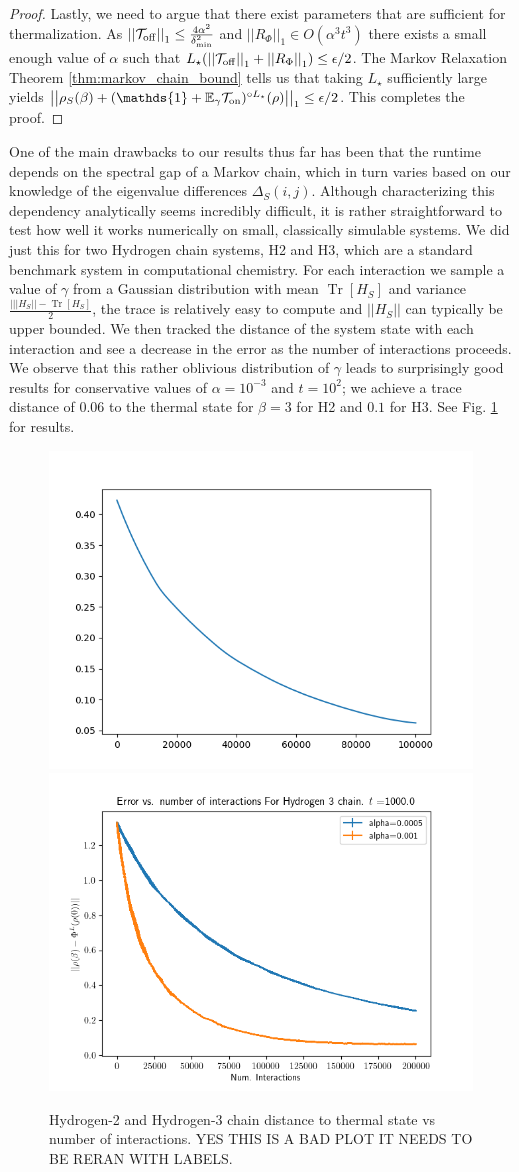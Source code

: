 \documentclass{article}
\newcommand{\on}{\rm on}
\newcommand{\off}{\rm off}
\newcommand{\brackets}[1]{\left[ #1 \right]}
\newcommand{\norm}[1]{\left| \left| #1 \right| \right|}
\newcommand{\bigo}[1]{O\left(#1\right)}
\DeclareMathOperator{\Tr}{Tr}
\newcommand{\trace}[1]{\Tr \brackets{ #1 }}
\newcommand{\identity}{\mathds{1}}
\begin{document}
\begin{proof}
Lastly, we need to argue that there exist parameters that are sufficient for thermalization. As $\norm{\mathcal{T}_{\off}}_1 \le \frac{4 \alpha^2}{\delta_{\min}^2}$ and $\norm{R_{\Phi}}_1 \in \bigo{\alpha^3 t^3}$ there exists a small enough value of $\alpha$ such that $L_{\star}(\norm{\mathcal{T}_{\off}}_1 + \norm{R_{\Phi}}_1) \le \epsilon / 2$. The Markov Relaxation Theorem \ref{thm:markov_chain_bound} tells us that taking $L_{\star}$ sufficiently large yields $\norm{\rho_S(\beta) + (\identity + \mathbb{E}_{\gamma} \mathcal{T}_{\on})^{\circ L_{\star}}(\rho)}_1 \le \epsilon /2$. This completes the proof.
\end{proof}

One of the main drawbacks to our results thus far has been that the runtime depends on the spectral gap of a Markov chain, which in turn varies based on our knowledge of the eigenvalue differences $\Delta_S(i,j)$. Although characterizing this dependency analytically seems incredibly difficult, it is rather straightforward to test how well it works numerically on small, classically simulable systems. We did just this for two Hydrogen chain systems, H2 and H3, which are a standard benchmark system in computational chemistry. For each interaction we sample a value of $\gamma$ from a Gaussian distribution with mean $\trace{H_S}$ and variance $\frac{|\norm{H_S} - \trace{H_S}}{2}$, the trace is relatively easy to compute and $\norm{H_S}$ can typically be upper bounded. We then tracked the distance of the system state with each interaction and see a decrease in the error as the number of interactions proceeds. We observe that this rather oblivious distribution of $\gamma$ leads to surprisingly good results for conservative values of $\alpha = 10^{-3}$ and $t = 10^2$; we achieve a trace distance of 0.06 to the thermal state for $\beta = 3$ for H2 and $0.1$ for H3. See Fig. \ref{fig:h_chain_error} for results.
\begin{figure}
    \centering
    \includegraphics[width=0.45\linewidth]{numerics/data/h2_chain_2.png}
    \includegraphics[width = 0.45\linewidth]{numerics/data/h3_chain_7.png}
    \caption{Hydrogen-2 and Hydrogen-3 chain distance to thermal state vs number of interactions. YES THIS IS A BAD PLOT IT NEEDS TO BE RERAN WITH LABELS.}
    \label{fig:h_chain_error}
\end{figure}
\end{document}
